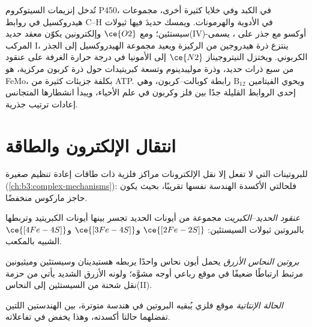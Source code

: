 تُدخل إنزيمات السيتوكروم P450، في الكبد وفي خلايا كثيرة أخرى، مجموعات هيدروكسيل في روابط C--H
في الأدوية والهرمونات. ويمسك حديدَ  فيها ثيولات سيستئين؛ ومع
$\ce{O2}$ وإلكترونين يكوّن معقد حديد(IV)-أوكسو مع جذر على
، يسمى المركب I، ينتزع ذرة هيدروجين من
الركيزة ويعيد مجموعة الهيدروكسيل إلى الجذر الكربوني. ويختزل النيتروجيناز
$\ce{N2}$ إلى الأمونيا في درجة حرارة الغرفة على عنقود من سبع ذرات حديد،
وذرة موليبدينوم وتسعة كبريتيدات حول ذرة كربون مركزية، هو 
FeMo، بكلفة جزيئات كثيرة من ATP. ويحوي الفيتامين $\mathrm{B_{12}}$ رابطة
كوبالت--كربون، وهي إحدى الروابط القليلة جدًا بين فلز وكربون في علم الأحياء، 
ويبدأ انشطارها المتجانس إعادات ترتيب جذرية.

\section{انتقال الإلكترون والطاقة}

للبروتينات التي لا تفعل إلا نقل الإلكترونات مراكز فلزية ذات طاقات
إعادة تنظيم صغيرة (\cref{ch:b3:complex-mechanisms}): فلحالتي الأكسدة
الهندسة نفسها تقريبًا، بحيث يكون حاجز ماركوس منخفضًا.

\begin{definition}\label{def:b3:bioinorganic:fes}
\emph{عنقود الحديد--الكبريت} مجموعة من أيونات
الحديد تجسر بينها أيونات الكبريتيد وتربطها بالبروتين ثيولات السيستئين:
$\ce{[2Fe-2S]}$ و$\ce{[3Fe-4S]}$ و$\ce{[4Fe-4S]}$ الشبيه بالمكعب.
\end{definition}

\begin{definition}\label{def:b3:bioinorganic:blue-copper}
\emph{بروتين النحاس الأزرق} يحمل أيون نحاس
واحدًا يربطه هستيدينان وسيستئين وميثيونين مرتبط ارتباطًا ضعيفًا في
موقع رباعي أوجه مشوَّه؛ ولونه الأزرق الشديد يأتي من حزمة
نقل شحنة من السيستئين إلى النحاس(II).
\end{definition}

\begin{definition}\label{def:b3:bioinorganic:entatic}
\emph{الحالة الإنتاتية} موقع فلزي يُبقيه
البروتين في هندسة متوترة، بين الهندستين اللتين تفضلهما حالتا
أكسدته، وهذا يخفض  في تفاعلاته.
\end{definition}

